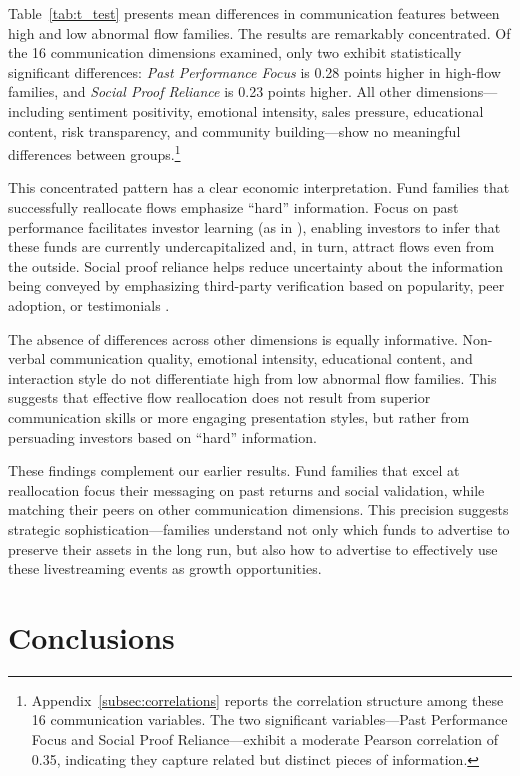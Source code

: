 \documentclass[12pt]{article}
\begin{document}
Table~\ref{tab:t_test} presents mean differences in communication features between high and low abnormal flow families. The results are remarkably concentrated. Of the 16 communication dimensions examined, only two exhibit statistically significant differences: \textit{Past Performance Focus} is 0.28 points higher in high-flow families, and \textit{Social Proof Reliance} is 0.23 points higher. All other dimensions—including sentiment positivity, emotional intensity, sales pressure, educational content, risk transparency, and community building—show no meaningful differences between groups.\footnote{Appendix~\ref{subsec:correlations} reports the correlation structure among these 16 communication variables. The two significant variables—Past Performance Focus and Social Proof Reliance—exhibit a moderate Pearson correlation of 0.35, indicating they capture related but distinct pieces of information.}


This concentrated pattern has a clear economic interpretation. Fund families that successfully reallocate flows emphasize ``hard'' information. Focus on past performance facilitates investor learning (as in \citet{berk2004mutual}), enabling investors to infer that these funds are currently undercapitalized and, in turn, attract flows even from the outside. Social proof reliance helps reduce uncertainty about the information being conveyed by emphasizing third-party verification based on popularity, peer adoption, or testimonials \citep{huang2007participation}.

The absence of differences across other dimensions is equally informative. Non-verbal communication quality, emotional intensity, educational content, and interaction style do not differentiate high from low abnormal flow families. This suggests that effective flow reallocation does not result from superior communication skills or more engaging presentation styles, but rather from persuading investors based on ``hard'' information.

These findings complement our earlier results. Fund families that excel at reallocation focus their messaging on past returns and social validation, while matching their peers on other communication dimensions. This precision suggests strategic sophistication---families understand not only which funds to advertise to preserve their assets in the long run, but also how to advertise to effectively use these livestreaming events as growth opportunities.

\section{Conclusions}\label{sec:conclusions}
\end{document}
